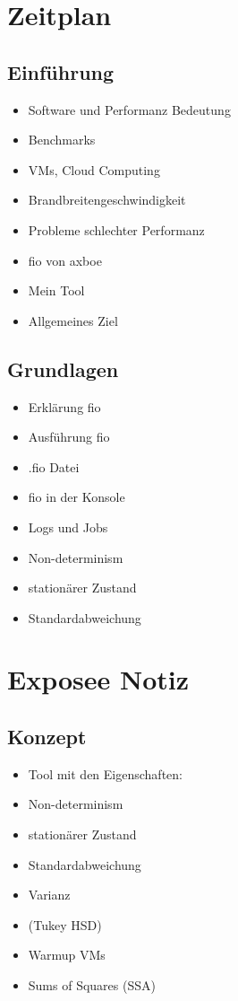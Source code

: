 \documentclass{article}
\begin{document}
\section{Zeitplan}
\subsection{Einführung}
 \begin{itemize}
    \item Software und Performanz Bedeutung
    \item Benchmarks
    \item VMs, Cloud Computing
    \item Brandbreitengeschwindigkeit
    \item Probleme schlechter Performanz
    \item fio von axboe
    \item Mein Tool
    \item Allgemeines Ziel
 \end{itemize}
\subsection{Grundlagen}
\begin{itemize}
    \item Erklärung fio
    \item Ausführung fio
    \item .fio Datei
    \item fio in der Konsole
    \item Logs und Jobs
    \item Non-determinism
    \item stationärer Zustand
    \item Standardabweichung
\end{itemize}
\section{Exposee Notiz}
\subsection{Konzept}
\begin{itemize}
    \item Tool mit den Eigenschaften:
    \item Non-determinism
    \item stationärer Zustand
    \item Standardabweichung
    \item Varianz
    \item (Tukey HSD)
    \item Warmup VMs
    \item Sums of Squares (SSA)
\end{itemize}
{}

\end{document}
